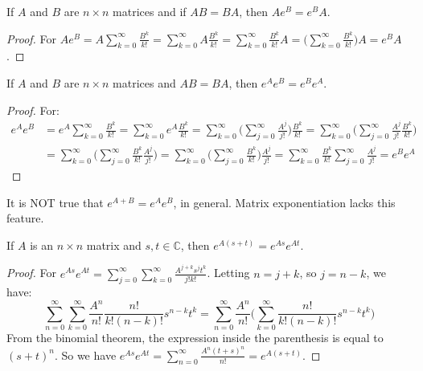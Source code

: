 \documentclass[crop=false,class=book,oneside]{standalone}                      %
\begin{document}
        \begin{theorem}
        If $A$ and $B$ are $n\times n$ matrices and if $AB = BA$, then $Ae^{B} = e^{B} A$.
        \end{theorem}
        \begin{proof}
        For $Ae^{B} = A\sum_{k=0}^{\infty} \frac{B^{k}}{k!} = \sum_{k=0}^{\infty} A\frac{B^{k}}{k!} = \sum_{k=0}^{\infty} \frac{B^{k}}{k!}A = \big(\sum_{k=0}^{\infty} \frac{B^{k}}{k!}\big)A = e^{B}A$.
        \end{proof}
        \begin{theorem}
        If $A$ and $B$ are $n\times n$ matrices and $AB = BA$, then $e^{A}e^{B} = e^{B}e^{A}$.
        \end{theorem}
        \begin{proof}
        For:
        \begin{align*}
            e^A e^B &= e^A\sum_{k=0}^{\infty}\frac{B^k}{k!}=\sum_{k=0}^{\infty} e^A\frac{B^k}{k!}= \sum_{k=0}^{\infty} \big(\sum_{j=0}^{\infty} \frac{A^j}{j!}\big) \frac{B^k}{k!}= \sum_{k=0}^{\infty}\big(\sum_{j=0}^{\infty} \frac{A^j}{j!}\frac{B^k}{k!}\big)\\
            &=\sum_{k=0}^{\infty}\big(\sum_{j=0}^{\infty} \frac{B^k}{k!}\frac{A^j}{j!}\big)=\sum_{k=0}^{\infty}\big(\sum_{j=0}^{\infty} \frac{B^k}{k!}\big)\frac{A^j}{j!}= \sum_{k=0}^{\infty}\frac{B^k}{k!}\sum_{j=0}^{\infty}\frac{A^j}{j!}=e^{B}e^{A}
        \end{align*}
        \end{proof}
        It is NOT true that $e^{A+B}=e^{A}e^{B}$, in general. Matrix exponentiation lacks this feature.
        \begin{theorem}
        If $A$ is an $n\times n$ matrix and $s,t\in \mathbb{C}$, then $e^{A(s+t)} = e^{As}e^{At}$.
        \end{theorem}
        \begin{proof}
        For $e^{As}e^{At} = \sum_{j=0}^{\infty} \sum_{k=0}^{\infty} \frac{A^{j+k}s^jt^k}{j!k!}$. Letting $n = j+k$, so $j = n-k$, we have:
        \begin{equation*}
            \sum_{n=0}^{\infty} \sum_{k=0}^{\infty} \frac{A^n}{n!}\frac{n!}{k!(n-k)!}s^{n-k}t^k = \sum_{n=0}^{\infty}\frac{A^n}{n!}\big(\sum_{k=0}^{\infty} \frac{n!}{k!(n-k)!}s^{n-k}t^k\big)    
        \end{equation*}
        From the binomial theorem, the expression inside the parenthesis is equal to $(s+t)^n$. So we have $e^{As}e^{At}=\sum_{n=0}^{\infty} \frac{A^n(t+s)^n}{n!} = e^{A(s+t)}$.
        \end{proof}
\end{document}
